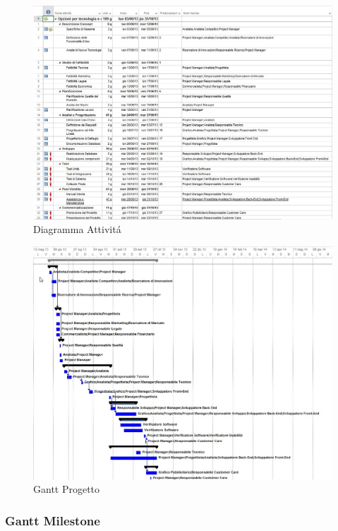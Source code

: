 \begin{figure}[H]
\begin{center}
\includegraphics[width=1\textwidth]{img/Attivita.jpg}
\caption{Diagramma  Attivit\'a}
\label{fig:Diagramma Attivit\'a}
\end{center}
\end{figure}
\begin{figure}[H]
\begin{center}
\includegraphics[width=1\textwidth]{img/Gantt.jpg}
\caption{Gantt Progetto}
\label{fig:Gantt Progetto}
\end{center}
\end{figure}
\newpage

\subsubsection{Gantt Milestone}


